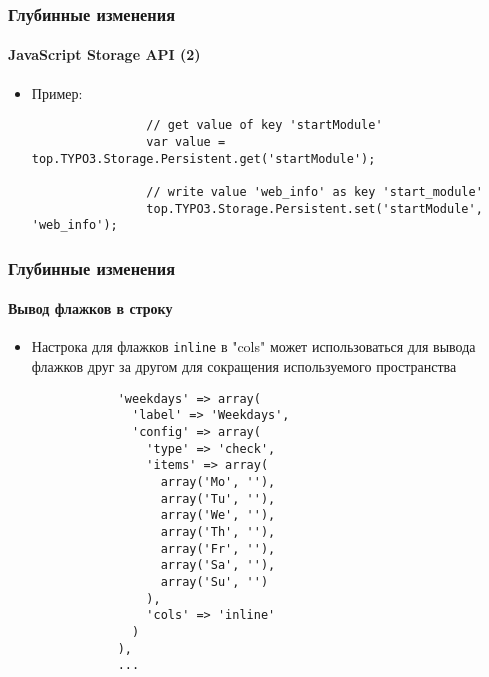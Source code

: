 \begin{frame}[fragile]
	\frametitle{Глубинные изменения}
	\framesubtitle{JavaScript Storage API (2)}

	\begin{itemize}
		\item Пример:
			\begin{lstlisting}
				// get value of key 'startModule'
				var value = top.TYPO3.Storage.Persistent.get('startModule');

				// write value 'web_info' as key 'start_module'
				top.TYPO3.Storage.Persistent.set('startModule', 'web_info');
			\end{lstlisting}

	\end{itemize}

\end{frame}


\begin{frame}[fragile]
	\frametitle{Глубинные изменения}
	\framesubtitle{Вывод флажков в строку}

	\lstset{basicstyle=\tiny\ttfamily}

	\begin{itemize}

		\item Настрока для флажков \texttt{inline} в "cols" может использоваться для вывода флажков
			друг за другом для сокращения используемого пространства

		\begin{lstlisting}
			'weekdays' => array(
			  'label' => 'Weekdays',
			  'config' => array(
			    'type' => 'check',
			    'items' => array(
			      array('Mo', ''),
			      array('Tu', ''),
			      array('We', ''),
			      array('Th', ''),
			      array('Fr', ''),
			      array('Sa', ''),
			      array('Su', '')
			    ),
			    'cols' => 'inline'
			  )
			),
			...
		\end{lstlisting}

	\end{itemize}

\end{frame}

